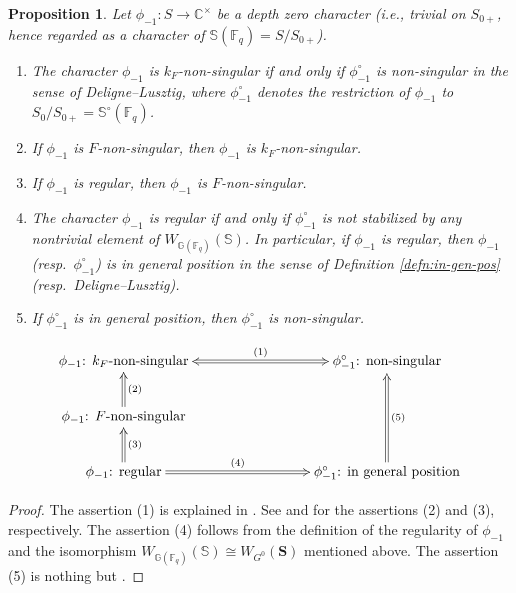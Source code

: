 \documentclass{amsart}
\newcommand{\F}{\mathbb{F}}
\newcommand{\C}{\mathbb{C}}
\newcommand{\bbS}{\mathbb{S}}
\newcommand{\bbG}{\mathbb{G}}
\newcommand{\bfS}{\mathbf{S}}
\theoremstyle{plain}
\newtheorem{prop}[thm]{Proposition}
\theoremstyle{definition}
\theoremstyle{remark}
\theoremstyle{theorem}
\begin{document}
\begin{prop}\label{prop:reg-nonsing}
Let $\phi_{-1}\colon S\rightarrow\C^{\times}$ be a depth zero character (i.e., trivial on $S_{0+}$, hence regarded as a character of $\bbS(\F_{q})=S/S_{0+}$).
\begin{enumerate}
\item
The character $\phi_{-1}$ is $k_{F}$-non-singular if and only if $\phi_{-1}^{\circ}$ is non-singular in the sense of Deligne--Lusztig, where $\phi_{-1}^{\circ}$ denotes the restriction of $\phi_{-1}$ to $S_{0}/S_{0+}=\bbS^{\circ}(\F_{q})$.
\item
If $\phi_{-1}$ is $F$-non-singular, then $\phi_{-1}$ is $k_{F}$-non-singular.
\item
If $\phi_{-1}$ is regular, then $\phi_{-1}$ is $F$-non-singular.
\item
The character $\phi_{-1}$ is regular if and only if $\phi_{-1}^{\circ}$ is not stabilized by any nontrivial element of $W_{\bbG(\F_{q})}(\bbS)$.
In particular, if $\phi_{-1}$ is regular, then $\phi_{-1}$ (resp.\ $\phi_{-1}^{\circ}$) is in general position in the sense of Definition \ref{defn:in-gen-pos} (resp.\ Deligne--Lusztig).
\item
If $\phi_{-1}^{\circ}$ is in general position, then $\phi_{-1}^{\circ}$ is non-singular.
\end{enumerate}
\[
\xymatrix{
\text{$\phi_{-1}$: $k_{F}$-non-singular} &&& \text{$\phi_{-1}^{\circ}$: non-singular} \ar@{<=>}_-{(1)}[lll] \\
\text{$\phi_{-1}$: $F$-non-singular} \ar@{=>}_-{(2)}[u] &&&\\
\text{$\phi_{-1}$: regular} \ar@{=>}_-{(3)}[u] \ar@{=>}^-{(4)}[rrr]&&& \text{$\phi_{-1}^{\circ}$: in general position} \ar@{=>}_-{(5)}[uu]
}
\]
\end{prop}

\begin{proof}
The assertion (1) is explained in \cite[Remark 3.1.3]{Kal19-sc}.
See \cite[Fact 3.1.5.1]{Kal19-sc} and \cite[Fact 3.1.5.3]{Kal19-sc} for the assertions (2) and (3), respectively.
The assertion (4) follows from the definition of the regularity of $\phi_{-1}$ and the isomorphism $W_{\bbG(\F_{q})}(\bbS)\cong W_{G^{0}}(\bfS)$ mentioned above.
The assertion (5) is nothing but \cite[Corollary 5.18]{DL76}.
\end{proof}
\end{document}
